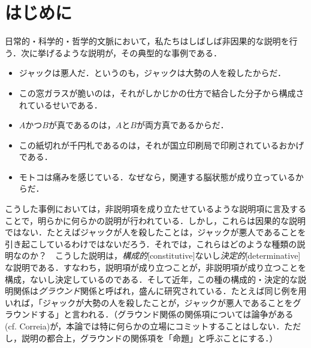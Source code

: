 \documentclass[twoside,14Q,uplatex,dvipdfmx]{jsarticle}
\theoremstyle{definition}
\begin{document}
\section{はじめに}\label{introduction}
日常的・科学的・哲学的文脈において，私たちはしばしば非因果的な説明を行う．次に挙げるような説明が，その典型的な事例である．
	\begin{itemize}
	\item ジャックは悪人だ．というのも，ジャックは大勢の人を殺したからだ．
	\item この窓ガラスが脆いのは，それがしかじかの仕方で結合した分子から構成されているせいである．
	\item $A$かつ$B$が真であるのは，$A$と$B$が両方真であるからだ．
	\item この紙切れが千円札であるのは，それが国立印刷局で印刷されているおかげである．
	\item モトコは痛みを感じている．なぜなら，関連する脳状態が成り立っているからだ．
	\end{itemize}
こうした事例においては，非説明項を成り立たせているような説明項に言及することで，明らかに何らかの説明が行われている．しかし，これらは因果的な説明ではない．たとえばジャックが人を殺したことは，ジャックが悪人であることを引き起こしているわけではないだろう．それでは，これらはどのような種類の説明なのか？　こうした説明は，\emph{構成的}[constitutive]ないし\emph{決定的}[determinative]な説明である．すなわち，説明項が成り立つことが，非説明項が成り立つことを構成，ないし決定しているのである．そして近年，この種の構成的・決定的な説明関係は\emph{グラウンド}関係と呼ばれ，盛んに研究されている．たとえば同じ例を用いれば，「ジャックが大勢の人を殺したことが，ジャックが悪人であることをグラウンドする」と言われる．（グラウンド関係の関係項については論争がある (cf. Correia\cite{Correia2020})が，本論では特に何らかの立場にコミットすることはしない．ただし，説明の都合上，グラウンドの関係項を「命題」と呼ぶことにする．）
\end{document}

